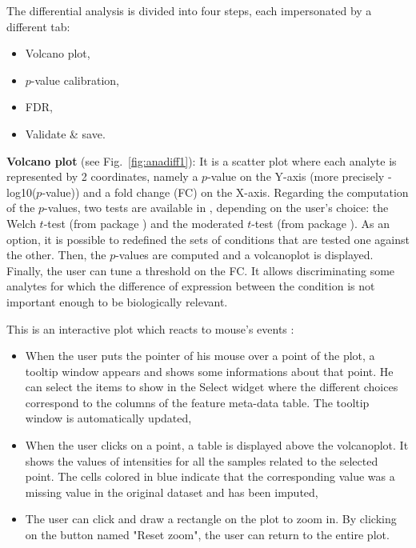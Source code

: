 \documentclass[12pt]{article}
\begin{document}
{{The differential analysis is divided into four steps, each impersonated by a 
different tab:
\begin{itemize}
\item Volcano plot,
\item $p$-value calibration,
\item FDR,
\item Validate \& save.
\end{itemize}}


\textbf {Volcano plot} (see Fig.~\ref{fig:anadiff1}): It is a scatter plot 
where each analyte is represented by 2 coordinates, namely a $p$-value on the 
Y-axis (more precisely -log10($p$-value)) and a fold change (FC) on the 
X-axis. Regarding the computation of the $p$-values, two tests are available 
in , depending on the user's choice: the Welch $t$-test 
(from package ) and the moderated $t$-test (from package 
).
As an option, it is possible to redefined the sets of conditions that are 
tested one against the other. 
Then, the $p$-values are computed and a volcanoplot is displayed. 
Finally, the user can tune a threshold on the FC. It allows discriminating 
some analytes for which the difference of expression between the condition is 
not important enough to be biologically relevant.

This is an interactive plot which reacts to mouse's events :
\begin{itemize}
\item When the user puts the pointer of his mouse over a
point of the plot, a tooltip window appears and shows some informations about 
that point. He can select the items to show in the Select widget where the 
different choices correspond to the columns of the feature meta-data table. 
The tooltip window is automatically updated,
\item When the user clicks on a point, a table is displayed above the 
volcanoplot. It shows the values of intensities for all the samples related to
the selected point. The cells colored in blue indicate that the corresponding 
value was a missing value in the original dataset and has been imputed,
\item The user can click and draw a rectangle on the plot to zoom in. 
By clicking on the button named "Reset zoom", the user can return to the 
entire plot.
\end{itemize}

}
\end{document}
